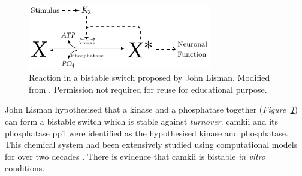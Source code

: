 \documentclass[]{resonance}
\newcommand\Fig[1]{\textit{Figure~\ref{#1}}}
\begin{document}
\begin{figure}[ht!]
    \centering
    \includegraphics[width=8cm]{./lisman_bistable.pdf}
    \caption{Reaction in a bistable switch proposed by John Lisman. Modified
        from \cite{lisman1985}. Permission not required for reuse for
        educational purpose.
    }\label{fig:lisman}
\end{figure}

John Lisman hypothesised that a kinase and a phosphatase together
(\Fig{fig:lisman}) can form a bistable switch which is stable against
\emph{turnover}. \gls{camkii} and its phosphatase \gls{pp1} were identified as
the hypothesised kinase and phosphatase. This chemical system had been
extensively studied using computational models for over two decades
\cite{sandstorm}. There is evidence that \gls{camkii} is bistable \emph{in
vitro} conditions. 
\end{document}
